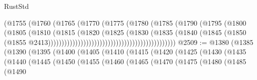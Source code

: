 \begin{lexlean}{RustStd}
\begin{coremodule}
{\begin{coremodule}
{{{{{{{{{{{{{{{{{{{{{{{{{{{{{{{{{{{{{{{{{{{{{{{{{{{{{{{{{{{{                                                        (@1755
                                                          (@1760
                                                            (@1765
                                                              (@1770
                                                                (@1775
                                                                  (@1780
                                                                    (@1785
                                                                      (@1790
                                                                        (@1795
                                                                          (@1800
                                                                            (@1805
                                                                              (@1810
                                                                                (@1815
                                                                                  (@1820
                                                                                    (@1825
                                                                                      (@1830
                                                                                        (@1835
                                                                                          (@1840
                                                                                            (@1845
                                                                                              (@1850
                                                                                                (@1855
                                                                                                  @2413)))))))))))))))))))))))))))))))))))))))))))))))
@2509 := @1380
    (@1385
      (@1390
        (@1395
          (@1400
            (@1405
              (@1410
                (@1415
                  (@1420
                    (@1425
                      (@1430
                        (@1435
                          (@1440
                            (@1445
                              (@1450
                                (@1455
                                  (@1460
                                    (@1465
                                      (@1470
                                        (@1475
                                          (@1480
                                            (@1485
                                              (@1490
}}}}}}}}}}}}}}}}}}}}}}}}}}}}}}}}}}}}}}}}}}}}}}}}}}}}}}}}}}}}
\end{coremodule}}
\end{coremodule}
\end{lexlean}
